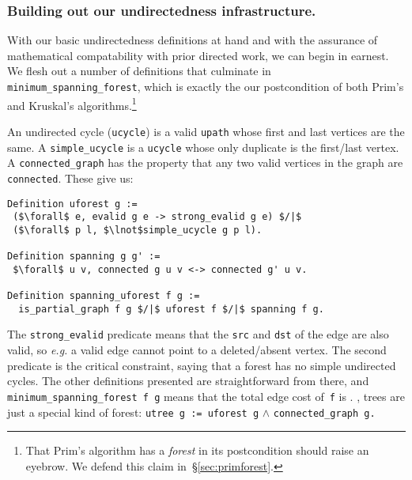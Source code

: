 \subsubsection{Building out our undirectedness infrastructure.}
With our basic undirectedness definitions at hand and with the assurance
of mathematical compatability with prior directed work, we can begin in 
earnest. We flesh out a number of definitions that culminate in 
\texttt{minimum\_spanning\_forest}, which is exactly the our postcondition
of both Prim's and Kruskal's algorithms.\footnote{That Prim's algorithm has
a \emph{forest} in its postcondition should raise an eyebrow. We defend this claim
in~\S\ref{sec:primforest}.}

An undirected cycle (\texttt{ucycle}) is a valid \texttt{upath} whose first 
and last vertices are the same.  A \texttt{simple\_ucycle} is a \texttt{ucycle} whose
only duplicate is the first/last vertex. A \texttt{connected\_graph}
has the property that any two valid vertices in the graph are \texttt{connected}.
These give us:
\lstset{style=CoqStyle}
\begin{lstlisting}
Definition uforest g := 
 ($\forall$ e, evalid g e -> strong_evalid g e) $/|$
 ($\forall$ p l, $\lnot$simple_ucycle g p l).

Definition spanning g g' := 
 $\forall$ u v, connected g u v <-> connected g' u v.

Definition spanning_uforest f g :=
  is_partial_graph f g $/|$ uforest f $/|$ spanning f g. 
\end{lstlisting}
The \texttt{strong\_evalid} predicate means that the 
\texttt{src} and \texttt{dst} of the edge are also valid, so
\emph{e.g.} a valid edge cannot point to a deleted/absent vertex.
The second predicate is the critical constraint, saying that a
forest has no simple undirected cycles. The other definitions presented
are straightforward from there, and 
\texttt{minimum\_spanning\_forest f g} means that the total edge cost 
of~\texttt{f} is .
, trees are just a special kind of forest:
\texttt{utree~g~:= uforest~g} $\wedge$ \texttt{connected\_graph~g.}



